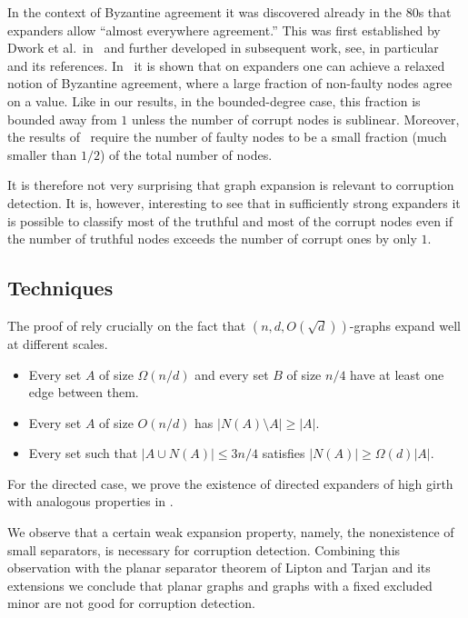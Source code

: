 \documentclass{toc}
\begin{document}
In the context of Byzantine agreement it was discovered already
in the 80s that expanders allow ``almost everywhere agreement.'' This
was first established by Dwork et al.\ in~\cite{DPPU} and  further 
developed in subsequent work, see, in particular~\cite{GO} and its 
references. In~\cite{DPPU} it is shown that on expanders 
one can achieve a relaxed notion of 
Byzantine agreement, where a large fraction of non-faulty nodes agree 
on a value. Like in our results, in the 
%
bounded-degree case,   %
this fraction is bounded away from $1$ 
unless the number of corrupt nodes is sublinear. 
Moreover, the results of~\cite{DPPU} require the number of 
faulty nodes to be a small fraction 
(much smaller than $1/2$) of the total number of nodes. 

It is therefore not very surprising that graph 
expansion is relevant to corruption detection. It is, however, interesting
to see that in sufficiently strong expanders it is possible to classify
most of the truthful and most of the corrupt nodes even if the number of
truthful nodes exceeds the number of corrupt ones by only $1$.

\subsection{Techniques} 

The proof of  rely crucially on the fact that $(n,d,O(\sqrt{d}))$-graphs expand well at different scales.  
%
%
%
%
%
%
\begin{itemize}
\item Every set $A$ of size $\Omega(n/d)$ and every set $B$ of size $n/4$ have at least one edge between them.
\item Every set $A$ of size $O(n/d)$ has $|N(A) \setminus A| \geq |A|$.  
\item Every set such that $|A \cup N(A)| \leq 3n/4$ satisfies $|N(A)| \geq \Omega(d) |A|$. 
\end{itemize} 

%
%
%
%
%
%
%
%

For the directed case, we prove the existence of directed expanders of high girth with analogous properties in 
.

%
%
%
%
%
%
%
%
%
%
%
%
%
%
%
We observe that a certain weak expansion property, 
namely, the nonexistence of small separators, is 
necessary for corruption detection.
Combining this observation with the 
planar separator theorem of Lipton and Tarjan and its extensions
we conclude that planar graphs and graphs with a fixed excluded minor 
are not good for corruption detection. 
\end{document}
